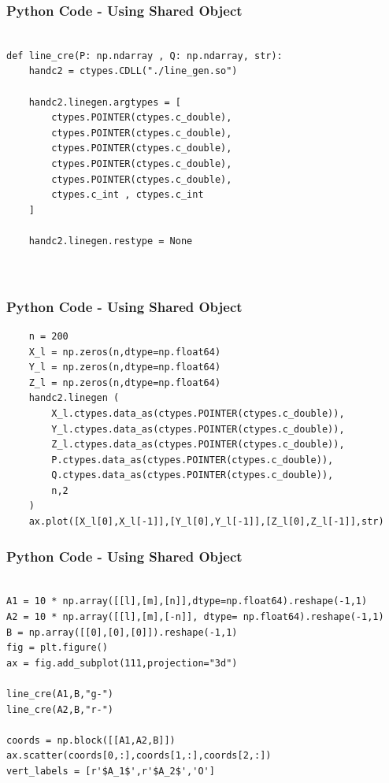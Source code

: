 \documentclass{beamer}
\begin{document}
\begin{frame}[fragile]
    \frametitle{Python Code - Using Shared Object}
    \begin{lstlisting}

def line_cre(P: np.ndarray , Q: np.ndarray, str):
    handc2 = ctypes.CDLL("./line_gen.so")

    handc2.linegen.argtypes = [
        ctypes.POINTER(ctypes.c_double),
        ctypes.POINTER(ctypes.c_double),
        ctypes.POINTER(ctypes.c_double),
        ctypes.POINTER(ctypes.c_double),
        ctypes.POINTER(ctypes.c_double),
        ctypes.c_int , ctypes.c_int
    ]

    handc2.linegen.restype = None
    


\end{lstlisting}
\end{frame}
\begin{frame}[fragile]
    \frametitle{Python Code - Using Shared Object}
    \begin{lstlisting}
    n = 200
    X_l = np.zeros(n,dtype=np.float64)
    Y_l = np.zeros(n,dtype=np.float64)
    Z_l = np.zeros(n,dtype=np.float64)
    handc2.linegen (
        X_l.ctypes.data_as(ctypes.POINTER(ctypes.c_double)),
        Y_l.ctypes.data_as(ctypes.POINTER(ctypes.c_double)),
        Z_l.ctypes.data_as(ctypes.POINTER(ctypes.c_double)),
        P.ctypes.data_as(ctypes.POINTER(ctypes.c_double)),
        Q.ctypes.data_as(ctypes.POINTER(ctypes.c_double)),
        n,2
    )
    ax.plot([X_l[0],X_l[-1]],[Y_l[0],Y_l[-1]],[Z_l[0],Z_l[-1]],str)

    \end{lstlisting}
\end{frame}

\begin{frame}[fragile]
    \frametitle{Python Code - Using Shared Object}
    \begin{lstlisting}

A1 = 10 * np.array([[l],[m],[n]],dtype=np.float64).reshape(-1,1)
A2 = 10 * np.array([[l],[m],[-n]], dtype= np.float64).reshape(-1,1)
B = np.array([[0],[0],[0]]).reshape(-1,1)
fig = plt.figure()
ax = fig.add_subplot(111,projection="3d")

line_cre(A1,B,"g-")
line_cre(A2,B,"r-")

coords = np.block([[A1,A2,B]])
ax.scatter(coords[0,:],coords[1,:],coords[2,:])
vert_labels = [r'$A_1$',r'$A_2$','O']


\end{lstlisting}
\end{frame}
\end{document}
